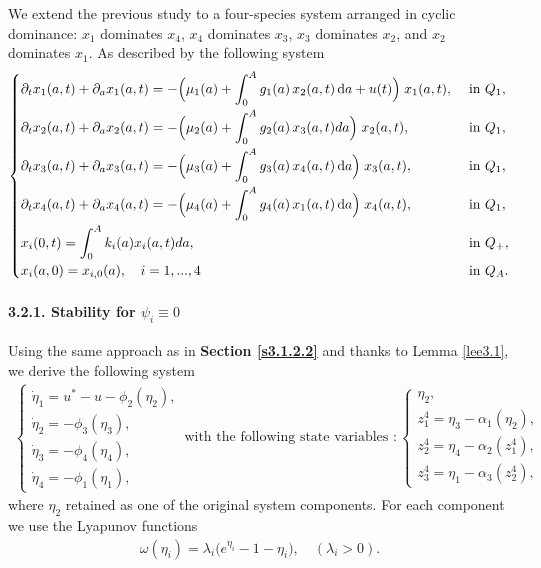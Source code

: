 \documentclass[10pt, a4paper]{amsart}
\theoremstyle{plain}
\theoremstyle{definition}
\theoremstyle{remark}
\numberwithin{equation}{section}
\begin{document}
We extend the previous study to a four-species system arranged in cyclic dominance: $x_1$ dominates $x_4$, $x_4$ dominates $x_3$, $x_3$ dominates $x_2$, and $x_2$ dominates $x_1.$ As described by the following system 
\begin{align}
 \begin{cases}
\displaystyle 
\partial_t x_1(a,t) + \partial_a x_1(a,t)
= -\Bigl(\mu_1(a) 
       + \int_0^A g_1(a)\,x_2(a,t)\,\mathrm{d}a
       + u(t)\Bigr)\;x_1(a,t),
& \text{ in } Q_1,\\[8pt]
\displaystyle 
\partial_t x_2(a,t) + \partial_a x_2(a,t)
= -\Bigl(\mu_2(a) 
       + \int_0^A g_2(a)\,x_3(a,t)da\Bigr)\;x_2(a,t),
& \text{ in } Q_1,\\[8pt]
\partial_t x_3(a,t) + \partial_a x_3(a,t)
= -\Bigl(\mu_3(a) 
       + \displaystyle\int_0^A g_3(a)\,x_4(a,t)\,\mathrm{d}a
       \Bigr)\;x_3(a,t),
& \text{ in } Q_1,\\[8pt]
\partial_t x_4(a,t) + \partial_a x_4(a,t)
= -\Bigl(\mu_4(a) 
       + \displaystyle\int_0^A g_4(a)\,x_1(a,t)\,\mathrm{d}a
       \Bigr)\;x_4(a,t),
& \text{ in } Q_1,\\[8pt]
\displaystyle 
x_i(0,t)
= \int_0^Ak_i(a)x_i(a,t)da,& \text{ in } Q_+,\\[6pt]
x_i(a,0) = x_{i,0}(a),\quad i=1,...,4
& \text{ in } Q_A.
\end{cases}
\end{align}

\paragraph{\bf 3.2.1. Stability for $\psi_i\equiv 0$}
Using the same approach as in {\bf Section \ref{s3.1.2.2}} and thanks to Lemma \ref{lee3.1}, we derive the following system
\begin{align}\label{equation3.99}
 \begin{cases}
\dot\eta_1 = u^* - u - \phi_2(\eta_2),\\
\dot\eta_2 =  - \phi_3(\eta_3),\\
\dot\eta_3 =  - \phi_4(\eta_4),\\
\dot\eta_4 =  - \phi_1(\eta_1),
\end{cases}\,\text{with the following state variables :}\, \begin{cases}
\eta_2,\\
z^4_1=\eta_3-\alpha_1(\eta_2),\\
z^4_2=\eta_4-\alpha_2(z^4_1),\\
z^4_3=\eta_1-\alpha_3(z^4_2),
\end{cases}
\end{align} 
where $\eta_2$ retained as one of the original system components. For each component we use the Lyapunov functions
\begin{align}\label{equation3.100}%
\omega(\eta_i)=\lambda_i\bigl(e^{\eta_i}-1-\eta_i\bigr),\quad (\lambda_i>0).
\end{align}
\end{document}
